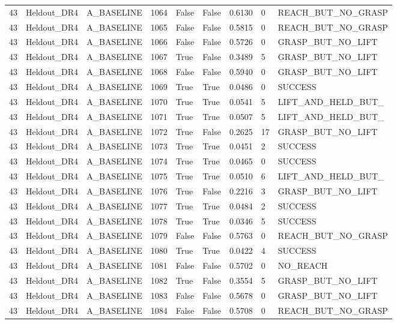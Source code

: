 \documentclass[11pt,a4paper,oneside]{book}
\begin{document}
\begin{longtable}{l l l l l l l l l}
43 & Heldout\_DR4 & A\_BASELINE & 1064 & False & False & 0.6130 & 0 & REACH\_BUT\_NO\_GRASP \\
43 & Heldout\_DR4 & A\_BASELINE & 1065 & False & False & 0.5815 & 0 & REACH\_BUT\_NO\_GRASP \\
43 & Heldout\_DR4 & A\_BASELINE & 1066 & False & False & 0.5726 & 0 & GRASP\_BUT\_NO\_LIFT \\
43 & Heldout\_DR4 & A\_BASELINE & 1067 & True & False & 0.3489 & 5 & GRASP\_BUT\_NO\_LIFT \\
43 & Heldout\_DR4 & A\_BASELINE & 1068 & False & False & 0.5940 & 0 & GRASP\_BUT\_NO\_LIFT \\
43 & Heldout\_DR4 & A\_BASELINE & 1069 & True & True & 0.0486 & 0 & SUCCESS \\
43 & Heldout\_DR4 & A\_BASELINE & 1070 & True & True & 0.0541 & 5 & LIFT\_AND\_HELD\_BUT\_ \\
43 & Heldout\_DR4 & A\_BASELINE & 1071 & True & True & 0.0507 & 5 & LIFT\_AND\_HELD\_BUT\_ \\
43 & Heldout\_DR4 & A\_BASELINE & 1072 & True & False & 0.2625 & 17 & GRASP\_BUT\_NO\_LIFT \\
43 & Heldout\_DR4 & A\_BASELINE & 1073 & True & True & 0.0451 & 2 & SUCCESS \\
43 & Heldout\_DR4 & A\_BASELINE & 1074 & True & True & 0.0465 & 0 & SUCCESS \\
43 & Heldout\_DR4 & A\_BASELINE & 1075 & True & True & 0.0510 & 6 & LIFT\_AND\_HELD\_BUT\_ \\
43 & Heldout\_DR4 & A\_BASELINE & 1076 & True & False & 0.2216 & 3 & GRASP\_BUT\_NO\_LIFT \\
43 & Heldout\_DR4 & A\_BASELINE & 1077 & True & True & 0.0484 & 2 & SUCCESS \\
43 & Heldout\_DR4 & A\_BASELINE & 1078 & True & True & 0.0346 & 5 & SUCCESS \\
43 & Heldout\_DR4 & A\_BASELINE & 1079 & False & False & 0.5763 & 0 & REACH\_BUT\_NO\_GRASP \\
43 & Heldout\_DR4 & A\_BASELINE & 1080 & True & True & 0.0422 & 4 & SUCCESS \\
43 & Heldout\_DR4 & A\_BASELINE & 1081 & False & False & 0.5702 & 0 & NO\_REACH \\
43 & Heldout\_DR4 & A\_BASELINE & 1082 & True & False & 0.3554 & 5 & GRASP\_BUT\_NO\_LIFT \\
43 & Heldout\_DR4 & A\_BASELINE & 1083 & False & False & 0.5678 & 0 & GRASP\_BUT\_NO\_LIFT \\
43 & Heldout\_DR4 & A\_BASELINE & 1084 & False & False & 0.5708 & 0 & REACH\_BUT\_NO\_GRASP \\

\end{longtable}
\end{document}
